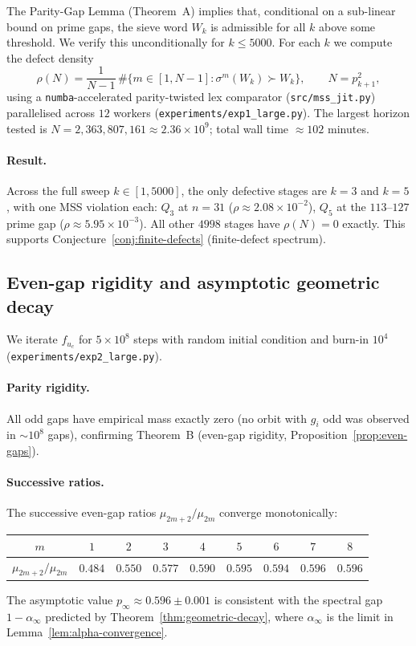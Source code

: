 The Parity-Gap Lemma (Theorem~A) implies that, conditional on a
sub-linear bound on prime gaps, the sieve word $W_k$ is admissible for
all $k$ above some threshold. We verify this unconditionally for
$k \leq 5000$. For each $k$ we compute the defect density
\[
    \rho(N) = \frac{1}{N - 1}\,\#\{ m \in [1, N - 1] : \sigma^m(W_k) \succ W_k \},
    \qquad N = p_{k+1}^2,
\]
using a \texttt{numba}-accelerated parity-twisted lex comparator
(\texttt{src/mss\_jit.py}) parallelised across $12$ workers
(\texttt{experiments/exp1\_large.py}). The largest horizon tested is
$N = 2{,}363{,}807{,}161 \approx 2.36 \times 10^9$; total wall time
$\approx 102$ minutes.

\paragraph{Result.} Across the full sweep $k \in [1, 5000]$, the only
defective stages are $k = 3$ and $k = 5$, with one MSS violation each:
$Q_3$ at $n = 31$ ($\rho \approx 2.08 \times 10^{-2}$), $Q_5$ at the
$113$--$127$ prime gap ($\rho \approx 5.95 \times 10^{-3}$). All other
$4998$ stages have $\rho(N) = 0$ exactly. This supports
Conjecture~\ref{conj:finite-defects} (finite-defect spectrum).

\subsection{Even-gap rigidity and asymptotic geometric decay}
\label{app:exp-decay}

We iterate $f_{u_c}$ for $5 \times 10^8$ steps with random initial
condition and burn-in $10^4$ (\texttt{experiments/exp2\_large.py}).

\paragraph{Parity rigidity.} All odd gaps have empirical mass exactly
zero (no orbit with $g_i$ odd was observed in $\sim 10^8$ gaps),
confirming Theorem~B (even-gap rigidity, Proposition~\ref{prop:even-gaps}).

\paragraph{Successive ratios.} The successive even-gap ratios
$\mu_{2m+2}/\mu_{2m}$ converge monotonically:
\begin{center}
\begin{tabular}{c|cccccccc}
$m$ & $1$ & $2$ & $3$ & $4$ & $5$ & $6$ & $7$ & $8$ \\
\hline
$\mu_{2m+2}/\mu_{2m}$ & $0.484$ & $0.550$ & $0.577$ & $0.590$ & $0.595$ & $0.594$ & $0.596$ & $0.596$ \\
\end{tabular}
\end{center}
The asymptotic value $p_\infty \approx 0.596 \pm 0.001$ is consistent
with the spectral gap $1 - \alpha_\infty$ predicted by
Theorem~\ref{thm:geometric-decay}, where $\alpha_\infty$ is the limit
in Lemma~\ref{lem:alpha-convergence}.

